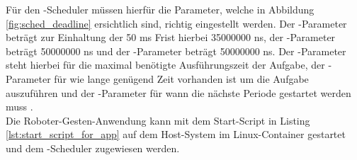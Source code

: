 Für den -Scheduler müssen hierfür die Parameter, welche in Abbildung \ref{fig:sched_deadline} ersichtlich sind, richtig eingestellt werden. Der -Parameter beträgt zur Einhaltung der 50 ms Frist hierbei 35000000 ns, der -Parameter beträgt 50000000 ns und der -Parameter beträgt 50000000 ns. Der -Parameter steht hierbei für die maximal benötigte Ausführungszeit der Aufgabe, der -Parameter für wie lange genügend Zeit vorhanden ist um die Aufgabe auszuführen und der -Parameter für wann die nächste Periode gestartet werden muss \cite{man_sched7_nodate}.\\

Die Roboter-Gesten-Anwendung kann mit dem Start-Script in Listing \ref{lst:start_script_for_app} auf dem Host-System im Linux-Container gestartet und dem -Scheduler zugewiesen werden.\\

